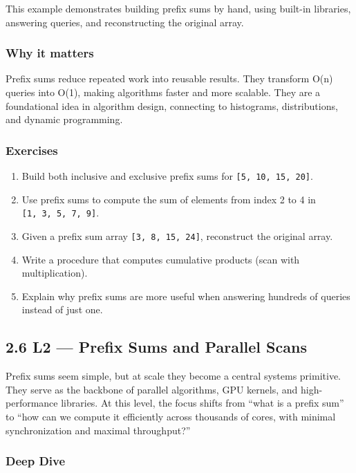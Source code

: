 \documentclass[
  letterpaper,
  DIV=11,
  numbers=noendperiod]{scrreprt}
\providecommand{\tightlist}{%
  \setlength{\itemsep}{0pt}\setlength{\parskip}{0pt}}
\begin{document}
This example demonstrates building prefix sums by hand, using built-in
libraries, answering queries, and reconstructing the original array.

\subsubsection{Why it matters}\label{why-it-matters-28}

Prefix sums reduce repeated work into reusable results. They transform
O(n) queries into O(1), making algorithms faster and more scalable. They
are a foundational idea in algorithm design, connecting to histograms,
distributions, and dynamic programming.

\subsubsection{Exercises}\label{exercises-28}

\begin{enumerate}
\def\labelenumi{\arabic{enumi}.}
\tightlist
\item
  Build both inclusive and exclusive prefix sums for
  \texttt{{[}5,\ 10,\ 15,\ 20{]}}.
\item
  Use prefix sums to compute the sum of elements from index 2 to 4 in
  \texttt{{[}1,\ 3,\ 5,\ 7,\ 9{]}}.
\item
  Given a prefix sum array \texttt{{[}3,\ 8,\ 15,\ 24{]}}, reconstruct
  the original array.
\item
  Write a procedure that computes cumulative products (scan with
  multiplication).
\item
  Explain why prefix sums are more useful when answering hundreds of
  queries instead of just one.
\end{enumerate}

\subsection{2.6 L2 --- Prefix Sums and Parallel
Scans}\label{l2-prefix-sums-and-parallel-scans}

Prefix sums seem simple, but at scale they become a central systems
primitive. They serve as the backbone of parallel algorithms, GPU
kernels, and high-performance libraries. At this level, the focus shifts
from ``what is a prefix sum'' to ``how can we compute it efficiently
across thousands of cores, with minimal synchronization and maximal
throughput?''

\subsubsection{Deep Dive}\label{deep-dive-20}
\end{document}
